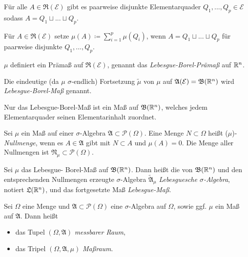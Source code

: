 \documentclass{cheat-sheet}
\newcommand{\PS}{\mathcal{P}} %
\newcommand{\PSO}{\PS(\Omega)} %
\newcommand{\Alg}{\mathfrak{A}} %
\newcommand{\Ring}{\mathfrak{R}} %
\newcommand{\Bor}{\mathfrak{B}} %
\theoremstyle{definition}
\begin{document}
\begin{satz}
  Für alle $A \in \Ring(\mathcal{E})$ gibt es paarweise disjunkte Elementarquader $Q_1, ..., Q_p \in \mathcal{E}$ sodass $A = Q_1 \sqcup ... \sqcup Q_p$.
\end{satz}

\begin{defn}
  Für $A \in \Ring(\mathcal{E})$ setze $\mu(A) \coloneqq \textstyle\sum_{i = 1}^p \mu(Q_i)$, wenn $A = Q_1 \sqcup ... \sqcup Q_p$ für paarweise disjunkte $Q_1, ..., Q_p$.
\end{defn}

\begin{satz}
  $\mu$ definiert ein Prämaß auf $\Ring(\mathcal{E})$, genannt das \emph{Lebesgue-Borel-Prämaß} auf $\mathbb{R}^n$.
\end{satz}

\begin{defn}
  Die eindeutige (da $\mu$ $\sigma$-endlich) Fortsetzung $\tilde{\mu}$ von $\mu$ auf $\Alg(\mathcal{E}) = \Bor(\R^n)$ wird \emph{Lebesgue-Borel-Maß} genannt.
\end{defn}

\begin{bem}
  Nur das Lebesgue-Borel-Maß ist ein Maß auf $\Bor(\R^n)$, welches jedem Elementarquader seinen Elementarinhalt zuordnet.
\end{bem}

\begin{defn}
  Sei $\mu$ ein Maß auf einer $\sigma$-Algebra $\Alg \subset \PSO$. Eine Menge $N \subset \Omega$ heißt ($\mu$)-\emph{Nullmenge}, wenn es $A \in \Alg$ gibt mit $N \subset A$ und $\mu(A) = 0$. Die Menge aller Nullmengen ist $\mathfrak{N}_\mu \subset \PSO$.
\end{defn}

\begin{defn}
  Sei $\mu$ das Lebesgue- Borel-Maß auf $\Bor(\R^n)$. Dann heißt die von $\Bor(\R^n)$ und den ent\-sprech\-en\-den Nullmengen erzeugte $\sigma$-Algebra $\tilde{\Alg}_\mu$ \emph{Lebesguesche $\sigma$-Algebra}, notiert $\mathfrak{L}(\mathbb{R}^n)$, und das fortgesetzte Maß \emph{Lebesgue-Maß}.
\end{defn}

\begin{defn}
  Sei $\Omega$ eine Menge und $\Alg \subset \PSO$ eine $\sigma$-Algebra auf $\Omega$, sowie ggf. $\mu$ ein Maß auf $\Alg$. Dann heißt
  \begin{itemize}
    \item das Tupel $(\Omega, \Alg)$ \emph{messbarer Raum},
    \item das Tripel $(\Omega, \Alg, \mu)$ \emph{Maßraum}.
  \end{itemize}
\end{defn}
\end{document}

